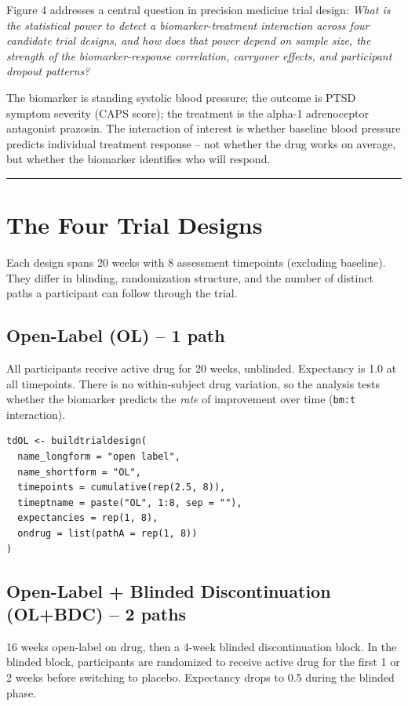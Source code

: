 \documentclass[11pt]{article}
\begin{document}
Figure 4 addresses a central question in precision medicine trial
design: \textit{What is the statistical power to detect a
biomarker-treatment interaction across four candidate trial
designs, and how does that power depend on sample size, the
strength of the biomarker-response correlation, carryover effects,
and participant dropout patterns?}

The biomarker is standing systolic blood pressure; the outcome is
PTSD symptom severity (CAPS score); the treatment is the alpha-1
adrenoceptor antagonist prazosin. The interaction of interest is
whether baseline blood pressure predicts individual treatment
response -- not whether the drug works on average, but whether the
biomarker identifies who will respond.

\bigskip\noindent\rule{\textwidth}{0.4pt}\bigskip

\section{The Four Trial Designs}

Each design spans 20 weeks with 8 assessment timepoints (excluding
baseline). They differ in blinding, randomization structure, and
the number of distinct paths a participant can follow through the
trial.

\subsection{Open-Label (OL) -- 1 path}

All participants receive active drug for 20 weeks, unblinded.
Expectancy is 1.0 at all timepoints. There is no within-subject
drug variation, so the analysis tests whether the biomarker
predicts the \textit{rate} of improvement over time (\texttt{bm:t}
interaction).

\begin{lstlisting}
tdOL <- buildtrialdesign(
  name_longform = "open label",
  name_shortform = "OL",
  timepoints = cumulative(rep(2.5, 8)),
  timeptname = paste("OL", 1:8, sep = ""),
  expectancies = rep(1, 8),
  ondrug = list(pathA = rep(1, 8))
)
\end{lstlisting}

\subsection{Open-Label + Blinded Discontinuation (OL+BDC) -- 2 paths}

16 weeks open-label on drug, then a 4-week blinded
discontinuation block. In the blinded block, participants are
randomized to receive active drug for the first 1 or 2 weeks
before switching to placebo. Expectancy drops to 0.5 during the
blinded phase.
\end{document}
